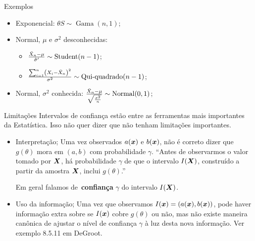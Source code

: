 \begin{frame}{Exemplos}
 \begin{itemize}
  \item Exponencial: $\theta S \sim \operatorname{Gama}(n, 1)$;
  \item Normal, $\mu$ e $\sigma^2$ desconhecidas:
\begin{itemize}
 \item $ \frac{\bar{X}_n - \mu}{\hat{\sigma}^\prime} \sim \operatorname{Student}(n-1)$;
 \item $\frac{\sum_{i=1}^n \left(X_i - \bar{X}_n \right)^2}{\sigma^2}\sim \operatorname{Qui-quadrado}(n-1)$; 
\end{itemize}
  \item Normal, $\sigma^2$ conhecida: $\frac{\bar{X}_n - \mu}{\sqrt{\frac{\sigma^2}{n}}} \sim \operatorname{Normal}(0, 1)$;
 \end{itemize}
\end{frame}

\begin{frame}{Limitações}
Intervalos de confiança estão entre as ferramentas mais importantes da Estatística.
Isso não quer dizer que não tenham limitações importantes.
\begin{itemize}
 \item Interpretação;
 Uma vez observados $a(\boldsymbol{x})$ e $b(\boldsymbol{x})$, não é correto dizer que $g(\theta)$ mora em $(a, b)$ com probabilidade $\gamma$.  
 ``Antes de observarmos o valor tomado por $\boldsymbol{X}$, há probabilidade $\gamma$ de que o intervalo $I(\boldsymbol{X})$, construído a partir da amostra $\boldsymbol{X}$, inclui $g(\theta)$.''
 
 Em geral falamos de~\textbf{confiança} $\gamma$ do intervalo $I(\boldsymbol{X})$.
 
 \item Uso da informação;
Uma vez que observamos $I(\boldsymbol{x}) = (a(\boldsymbol{x}), b(\boldsymbol{x}))$, pode haver informação extra sobre se $I(\boldsymbol{x})$ cobre $g(\theta)$ ou não, mas não existe maneira canônica de ajustar o nível de confiança $\gamma$ à luz desta nova informação.
Ver exemplo 8.5.11 em DeGroot. 
\end{itemize}

\end{frame}


